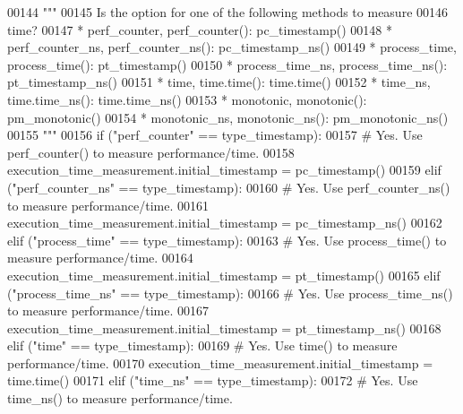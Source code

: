 \begin{DoxyCode}
00144         \textcolor{stringliteral}{"""}
00145 \textcolor{stringliteral}{            Is the option for one of the following methods to measure}
00146 \textcolor{stringliteral}{                time?}
00147 \textcolor{stringliteral}{                * perf\_counter, perf\_counter(): pc\_timestamp()}
00148 \textcolor{stringliteral}{                * perf\_counter\_ns, perf\_counter\_ns(): pc\_timestamp\_ns()}
00149 \textcolor{stringliteral}{                * process\_time, process\_time(): pt\_timestamp()}
00150 \textcolor{stringliteral}{                * process\_time\_ns, process\_time\_ns(): pt\_timestamp\_ns()}
00151 \textcolor{stringliteral}{                * time, time.time(): time.time()}
00152 \textcolor{stringliteral}{                * time\_ns, time.time\_ns(): time.time\_ns()}
00153 \textcolor{stringliteral}{                * monotonic, monotonic(): pm\_monotonic()}
00154 \textcolor{stringliteral}{                * monotonic\_ns, monotonic\_ns(): pm\_monotonic\_ns()}
00155 \textcolor{stringliteral}{        """}
00156         \textcolor{keywordflow}{if} (\textcolor{stringliteral}{"perf\_counter"} == type\_timestamp):
00157             \textcolor{comment}{# Yes. Use perf\_counter() to measure performance/time.}
00158             execution\_time\_measurement.initial\_timestamp = pc\_timestamp()
00159         \textcolor{keywordflow}{elif} (\textcolor{stringliteral}{"perf\_counter\_ns"} == type\_timestamp):
00160             \textcolor{comment}{# Yes. Use perf\_counter\_ns() to measure performance/time.}
00161             execution\_time\_measurement.initial\_timestamp = pc\_timestamp\_ns()
00162         \textcolor{keywordflow}{elif} (\textcolor{stringliteral}{"process\_time"} == type\_timestamp):
00163             \textcolor{comment}{# Yes. Use process\_time() to measure performance/time.}
00164             execution\_time\_measurement.initial\_timestamp = pt\_timestamp()
00165         \textcolor{keywordflow}{elif} (\textcolor{stringliteral}{"process\_time\_ns"} == type\_timestamp):
00166             \textcolor{comment}{# Yes. Use process\_time\_ns() to measure performance/time.}
00167             execution\_time\_measurement.initial\_timestamp = pt\_timestamp\_ns()
00168         \textcolor{keywordflow}{elif} (\textcolor{stringliteral}{"time"} == type\_timestamp):
00169             \textcolor{comment}{# Yes. Use time() to measure performance/time.}
00170             execution\_time\_measurement.initial\_timestamp = time.time()
00171         \textcolor{keywordflow}{elif} (\textcolor{stringliteral}{"time\_ns"} == type\_timestamp):
00172             \textcolor{comment}{# Yes. Use time\_ns() to measure performance/time.}

\end{DoxyCode}
